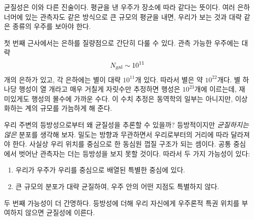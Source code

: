균질성은 이와 다른 진술이다. 평균을 낸 우주가 장소에 따라 같다는 뜻이다. 여러 은하 너머에 있는 관측자도 같은 방식으로 큰 규모의 평균을 내면, 우리가 보는 것과 대략 같은 종류의 우주를 보아야 한다.

첫 번째 근사에서는 은하를 질량점으로 간단히 다룰 수 있다. 관측 가능한 우주에는 대략 \begin{equation}
N_{\rm gal}\sim 10^{11}
\end{equation}개의 은하가 있고, 각 은하에는 별이 대략 \(10^{11}\)개 있다. 따라서 별은 약 \(10^{22}\)개다. 별 하나당 행성이 열 개라고 매우 거칠게 자릿수만 추정하면 행성은 \(10^{23}\)개에 이르는데, 재미있게도 행성의 몰수에 가까운 수다. 이 수치 추정은 동역학의 일부는 아니지만, 이상화하는 계의 규모를 가늠하게 해 준다.

\begin{classroomqa}\end{classroomqa}

우리 주변의 등방성으로부터 왜 균질성을 추론할 수 있을까? 등방적이지만 \emph{균질하지는 않은} 분포를 생각해 보자. 밀도는 방향과 무관하면서 우리로부터의 거리에 따라 달라져야 한다. 사실상 우리 위치를 중심으로 한 동심원 껍질 구조가 되는 셈이다. 공통 중심에서 벗어난 관측자는 더는 등방성을 보지 못할 것이다. 따라서 두 가지 가능성이 있다: \begin{enumerate}\item 우리가 우주가 우리를 중심으로 배열된 특별한 중심에 있다.\item 큰 규모의 분포가 대략 균질하여, 우주 안의 어떤 지점도 특별하지 않다.\end{enumerate}두 번째 가능성이 더 간명하다. 등방성에 더해 우리 자신에게 우주론적 특권 위치를 부여하지 않으면 균질성에 이른다.

\begin{classroomqa}\end{classroomqa}

